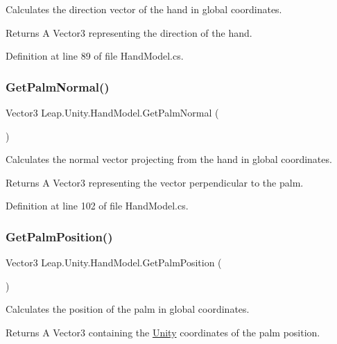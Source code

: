 Calculates the direction vector of the hand in global coordinates. \begin{DoxyReturn}{Returns}
A Vector3 representing the direction of the hand. 
\end{DoxyReturn}


Definition at line 89 of file Hand\+Model.\+cs.

\mbox{\label{class_leap_1_1_unity_1_1_hand_model_a9208dad95a201d7e6cb8570d325ce993}} 
\subsubsection{\texorpdfstring{GetPalmNormal()}{GetPalmNormal()}}
{\footnotesize\ttfamily Vector3 Leap.\+Unity.\+Hand\+Model.\+Get\+Palm\+Normal (\begin{DoxyParamCaption}{ }\end{DoxyParamCaption})}

Calculates the normal vector projecting from the hand in global coordinates. \begin{DoxyReturn}{Returns}
A Vector3 representing the vector perpendicular to the palm. 
\end{DoxyReturn}


Definition at line 102 of file Hand\+Model.\+cs.

\mbox{\label{class_leap_1_1_unity_1_1_hand_model_a17386cdea4e2d9bfdc9fbf88e5eafd37}} 
\subsubsection{\texorpdfstring{GetPalmPosition()}{GetPalmPosition()}}
{\footnotesize\ttfamily Vector3 Leap.\+Unity.\+Hand\+Model.\+Get\+Palm\+Position (\begin{DoxyParamCaption}{ }\end{DoxyParamCaption})}

Calculates the position of the palm in global coordinates. \begin{DoxyReturn}{Returns}
A Vector3 containing the \mbox{\hyperlink{namespace_leap_1_1_unity}{Unity}} coordinates of the palm position. 
\end{DoxyReturn}


